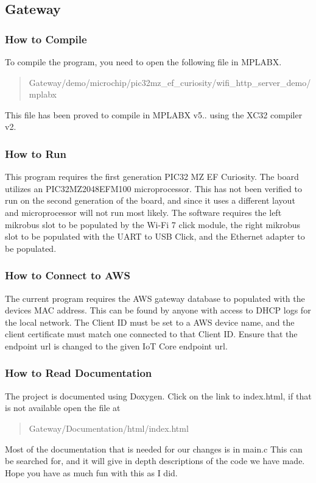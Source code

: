 \subsection*{Gateway}

\subsubsection*{How to Compile}

To compile the program, you need to open the following file in M\+P\+L\+A\+BX.

\begin{quote}
Gateway/demo/microchip/pic32mz\+\_\+ef\+\_\+curiosity/wifi\+\_\+http\+\_\+server\+\_\+demo/mplabx \end{quote}


This file has been proved to compile in M\+P\+L\+A\+BX v5.. using the X\+C32 compiler v2.

\subsubsection*{How to Run}

This program requires the first generation P\+I\+C32 MZ EF Curiosity. The board utilizes an P\+I\+C32\+M\+Z2048\+E\+F\+M100 microprocessor. This has not been verified to run on the second generation of the board, and since it uses a different layout and microprocessor will not run most likely. The software requires the left mikrobus slot to be populated by the Wi-\/\+Fi 7 click module, the right mikrobus slot to be populated with the U\+A\+RT to U\+SB Click, and the Ethernet adapter to be populated.

\subsubsection*{How to Connect to A\+WS}

The current program requires the A\+WS gateway database to populated with the device\textquotesingle{}s M\+AC address. This can be found by anyone with access to D\+H\+CP logs for the local network. The Client ID must be set to a A\+WS device name, and the client certificate must match one connected to that Client ID. Ensure that the endpoint url is changed to the given IoT Core endpoint url.

\subsubsection*{How to Read Documentation}

The project is documented using Doxygen. Click on the link to index.\+html, if that is not available open the file at

\begin{quote}
Gateway/\+Documentation/html/index.\+html \end{quote}


Most of the documentation that is needed for our changes is in main.\+c This can be searched for, and it will give in depth descriptions of the code we have made. Hope you have as much fun with this as I did. 